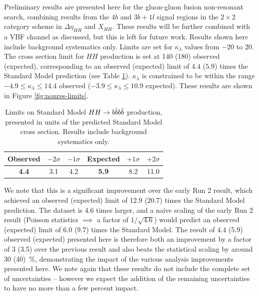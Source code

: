 Preliminary results are presented here for the gluon-gluon fusion non-resonant search, combining results from the $4b$ 
and $3b+1l$ signal regions in the $2\times 2$ category scheme in $\Delta \eta_{HH}$ and $X_{HH}$. These results will be 
further combined with a VBF channel as discussed, but this is left for future work. Results shown here include background 
systematics only. Limits are set for $\kappa_{\lambda}$ values from $-20$ to $20$. 
The cross section limit for $HH$ production is set at \SI{140}{\fb} (\SI{180}{\fb}) observed (expected), 
corresponding to an observed (expected) limit of $4.4$ ($5.9$) times the Standard Model prediction (see Table \ref{tbl:SM-HH-limits}). 
$\kappa_{\lambda}$ is constrained to be within the range $-4.9 \leq \kappa_{\lambda} \leq 14.4$ observed 
($-3.9 \leq \kappa_{\lambda} \leq 10.9$ expected). These results are shown in Figure \ref{fig:nonres-limits}.

\begin{table}
\centering
\begin{tabular}{ |c|c|c|c|c|c| } 
\hline
\textbf{Observed} & $-2\sigma$ & $-1\sigma$ & \textbf{Expected} & $+1\sigma$ & $+2\sigma$\\
 \hline
\textbf{4.4}	& 3.1	& 4.2 & \textbf{5.9}	& 8.2 & 11.0\\
 \hline
\end{tabular}
 \caption{\label{tbl:SM-HH-limits} Limits on Standard Model $HH\rightarrow b\bar{b}b\bar{b}$ production, presented in units of the 
predicted Standard Model cross section. Results include background systematics only.}
\end{table}

We note that this is a significant improvement over the early Run 2 result, which achieved an observed (expected) 
limit of 12.9 (20.7) times the Standard Model prediction. The dataset is 4.6 times larger, and a naive scaling 
of the early Run 2 result (Poisson statistics $\implies$ a factor of $1/\sqrt{4.6}$) would predict an observed (expected)
limit of 6.0 (9.7) times the Standard Model. The result of 4.4 (5.9) observed (expected) presented here is 
therefore both an improvement by a factor of 3 (3.5) over the previous result and also beats the statistical 
scaling by around 30 (40)~\%, demonstrating the impact of the various analysis improvements presented here. We 
note again that these results do not include the complete set of uncertainties -- however we expect the addition 
of the remaining uncertainties to have no more than a few percent impact.

